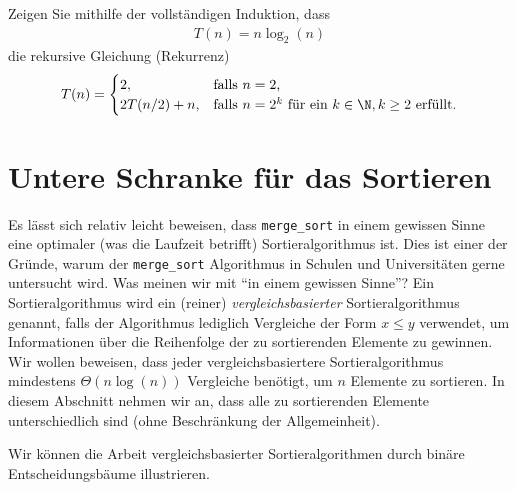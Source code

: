\begin{myexercise}\label{myexercise:0503}
	Zeigen Sie mithilfe der vollständigen Induktion, dass
	\begin{align*}
		T(n) = n\log_2(n)
	\end{align*}
	die rekursive Gleichung (Rekurrenz)
	\[
		T(n) =
		\begin{cases}
			2,           & \text{falls $n = 2$,}                                     \\
			2T(n/2) + n, & \text{falls $n = 2^k$ für ein $k\in\N, k\geq 2$ erfüllt.}
		\end{cases}
	\]
\end{myexercise}


\section{Untere Schranke für das Sortieren}
Es lässt sich relativ leicht beweisen, dass \lstinline{merge_sort} in einem gewissen Sinne eine optimaler (was die Laufzeit betrifft) Sortieralgorithmus ist. 
Dies ist einer der Gründe, warum der \lstinline{merge_sort} Algorithmus in Schulen und Universitäten gerne untersucht wird. 
Was meinen wir mit \enquote{in einem gewissen Sinne}? Ein Sortieralgorithmus wird ein (reiner) \textit{vergleichsbasierter} Sortieralgorithmus genannt, falls der Algorithmus lediglich Vergleiche der Form $x \leq y$ verwendet, um Informationen über die Reihenfolge der zu sortierenden Elemente zu gewinnen. 
Wir wollen beweisen, dass jeder vergleichsbasiertere Sortieralgorithmus mindestens $\Theta(n\log(n))$ Vergleiche benötigt, um $n$ Elemente zu sortieren. 
In diesem Abschnitt nehmen wir an, dass alle zu sortierenden Elemente unterschiedlich sind (ohne Beschränkung der Allgemeinheit).

Wir können die Arbeit vergleichsbasierter Sortieralgorithmen durch binäre Entscheidungsbäume illustrieren.

